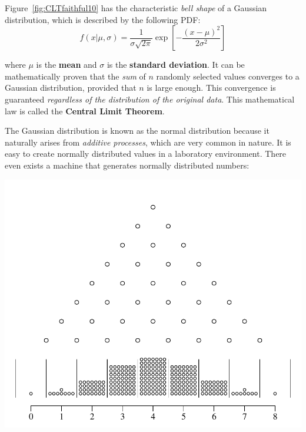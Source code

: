 Figure~\ref{fig:CLTfaithful10} has the characteristic \emph{bell
  shape} of a Gaussian distribution, which is described by the
following PDF:
\begin{equation}
  f(x|\mu,\sigma) = \frac{1}{\sigma\sqrt{2\pi}}
  \exp\!\left[-\frac{(x-\mu)^2}{2\sigma^2}\right]
  \label{eq:gauss}
\end{equation}

\noindent where $\mu$ is the \textbf{mean} and $\sigma$ is the
\textbf{standard deviation}. It can be mathematically proven that the
\emph{sum} of $n$ randomly selected values converges to a Gaussian
distribution, provided that $n$ is large enough. This convergence is
guaranteed \textit{regardless of the distribution of the original
  data}.  This mathematical law is called the \textbf{Central Limit
  Theorem}.\medskip

The Gaussian distribution is known as the normal distribution because
it naturally arises from \emph{additive processes}, which are very
common in nature. It is easy to create normally distributed values in
a laboratory environment. There even exists a machine that generates
normally distributed numbers:

\noindent\begin{minipage}[t][][b]{.55\textwidth}
  \includegraphics[width=\textwidth]{../figures/galtonsbeanmachine.pdf}\medskip
\end{minipage}
\begin{minipage}[t][][t]{.45\textwidth}
  \label{fig:galtonsbeanmachine}
\end{minipage}

